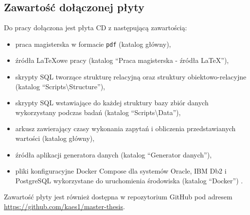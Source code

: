 \documentclass[a4paper,twoside,12pt]{book}
\renewcommand{\lstlistingname}{Kod}%
\begin{document}
\begin{appendices}
\chapter*{Zawartość dołączonej płyty}

Do pracy dołączona jest płyta CD z następującą zawartością:
\begin{itemize}
\item praca magisterska w formacie \texttt{pdf} (katalog główny),
\item źródła \LaTeX owe pracy (katalog ``Praca magisterska - źródła LaTeX''),
\item skrypty SQL tworzące strukturę relacyjną oraz struktury obiektowo-relacyjne (katalog ``Scripts\textbackslash Structure''),
\item skrypty SQL wstawiające do każdej struktury bazy zbiór danych wykorzystany podczas badań (katalog ``Scripts\textbackslash Data''),
\item arkusz zawierający czasy wykonania zapytań i obliczenia przedstawianych wartości (katalog główny), 
\item źródła aplikacji generatora danych (katalog ``Generator danych''),
\item pliki konfiguracyjne Docker Compose dla systemów Oracle, IBM Db2 i PostgreSQL wykorzystane do uruchomienia środowiska (katalog ``Docker'') .
\end{itemize}

Zawartość płyty jest również dostępna w repozytorium GitHub pod adresem \url{https://github.com/kaes1/master-thesis}.


\listoffigures
{}
\listoftables
{}

\renewcommand{\lstlistingname}{Kod}%
\renewcommand*{\lstlistlistingname}{Spis fragmentów kodu}
\lstlistoflistings
	
\end{appendices}
\end{document}
